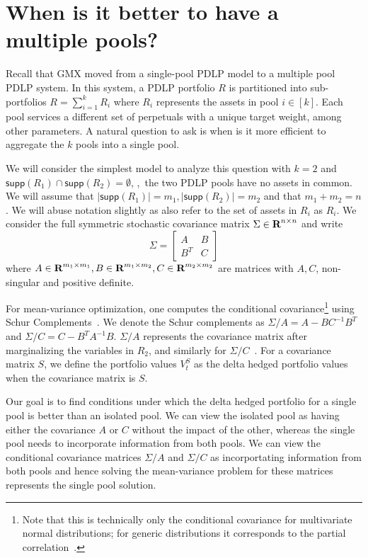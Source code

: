 \section{When is it better to have a multiple pools?}\label{app:multipool}
Recall that GMX moved from a single-pool PDLP model to a multiple pool PDLP system.
In this system, a PDLP portfolio $R$ is partitioned into sub-portfolios $R = \sum_{i=1}^k R_i$ where $R_i$ represents the assets in pool $i \in [k]$.
Each pool services a different set of perpetuals with a unique target weight, among other parameters.
A natural question to ask is when is it more efficient to aggregate the $k$ pools into a single pool.

We will consider the simplest model to analyze this question with $k = 2$ and $\mathsf{supp}(R_1) \cap \mathsf{supp}(R_2) = \emptyset$, \ie,~the two PDLP pools have no assets in common.
We will assume that $|\mathsf{supp}(R_1)| = m_1, |\mathsf{supp}(R_2)| = m_2$ and that $m_1+m_2 = n$.
We will abuse notation slightly as also refer to the set of assets in $R_i$ as $R_i$.
We consider the full symmetric stochastic covariance matrix $\Sigma \in {\mbox{\bf R}}^{n \times n}$ and write
\[
\Sigma = \left[
\begin{matrix}
    A & B \\ 
    B^T & C
\end{matrix}
\right]
\]
where $A \in {\mbox{\bf R}}^{m_1 \times m_1}, B \in {\mbox{\bf R}}^{m_1 \times m_2}, C \in {\mbox{\bf R}}^{m_2 \times m_2}$ are matrices with $A, C$, non-singular and positive definite.

For mean-variance optimization, one computes the conditional covariance\footnote{Note that this is technically only the conditional covariance for multivariate normal distributions; for generic distributions it corresponds to the partial correlation~\cite[\S6.2.3]{zhang2006schur}.} using Schur Complements~\cite{ouellette1981schur, zhang2006schur}.
We denote the Schur complements as $\Sigma / A = A - B C^{-1} B^{T}$ and $\Sigma / C = C - B^T A^{-1} B$.
$\Sigma / A$ represents the covariance matrix after marginalizing the variables in $R_2$, and similarly for $\Sigma / C$~\cite[\S6.2.3]{zhang2006schur}.
For a covariance matrix $S$, we define the portfolio values $V_t^S$ as the delta hedged portfolio values when the covariance matrix is $S$.

Our goal is to find conditions under which the delta hedged portfolio for a single pool is better than an isolated pool.
We can view the isolated pool as having either the covariance $A$ or $C$ without the impact of the other, whereas the single pool needs to incorporate information from both pools.
We can view the conditional covariance matrices $\Sigma / A$ and $\Sigma / C$ as incorportating information from both pools and hence solving the mean-variance problem for these matrices represents the single pool solution.

